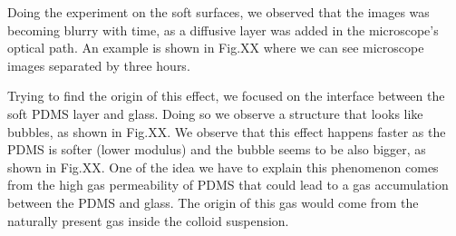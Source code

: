 Doing the experiment on the soft surfaces, we observed that the images was becoming blurry with time, as a diffusive layer was added in the microscope's optical path. An example is shown in Fig.XX where we can see microscope images separated by three hours.


Trying to find the origin of this effect, we focused on the interface between the soft PDMS layer and glass. Doing so we observe a structure that looks like bubbles, as shown in Fig.XX. We observe that this effect happens faster as the PDMS is softer (lower modulus) and the bubble seems to be also bigger, as shown in Fig.XX. One of the idea we have to explain this phenomenon comes from the high gas permeability of PDMS that could lead to a gas accumulation between the PDMS and glass. The origin of this gas would come from the naturally present gas inside the colloid suspension.
